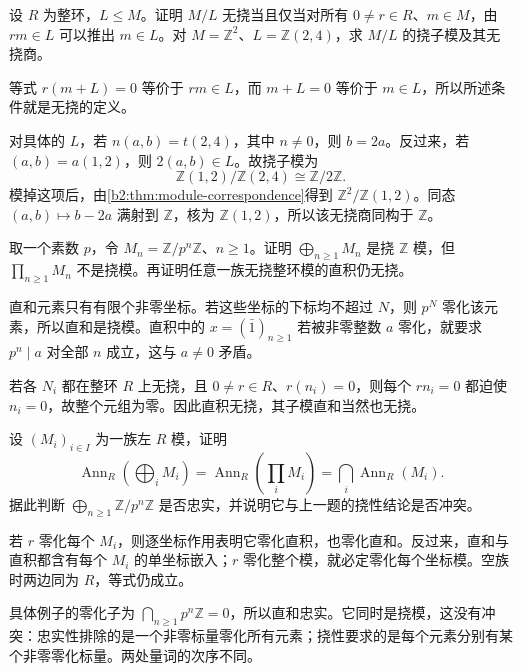 \begin{exercise}\label{b2:ex:02-torsion-quotient-lattice}
	设 \(R\) 为整环，\(L\le M\)。证明 \(M/L\) 无挠当且仅当对所有 \(0\ne r\in R\)、\(m\in M\)，由 \(rm\in L\) 可以推出 \(m\in L\)。对 \(M=\mathbb Z^2\)、\(L=\mathbb Z(2,4)\)，求 \(M/L\) 的挠子模及其无挠商。
\end{exercise}
\begin{solution}
	等式 \(r(m+L)=0\) 等价于 \(rm\in L\)，而 \(m+L=0\) 等价于 \(m\in L\)，所以所述条件就是无挠的定义。

	对具体的 \(L\)，若 \(n(a,b)=t(2,4)\)，其中 \(n\ne0\)，则 \(b=2a\)。反过来，若 \((a,b)=a(1,2)\)，则 \(2(a,b)\in L\)。故挠子模为
	\[
		\mathbb Z(1,2)/\mathbb Z(2,4)\cong\mathbb Z/2\mathbb Z.
	\]
	模掉这项后，由\cref{b2:thm:module-correspondence}得到 \(\mathbb Z^2/\mathbb Z(1,2)\)。同态 \((a,b)\mapsto b-2a\) 满射到 \(\mathbb Z\)，核为 \(\mathbb Z(1,2)\)，所以该无挠商同构于 \(\mathbb Z\)。
\end{solution}

\begin{exercise}\label{b2:ex:02-torsion-product}
	取一个素数 \(p\)，令 \(M_n=\mathbb Z/p^n\mathbb Z\)、\(n\ge1\)。证明 \(\bigoplus_{n\ge1}M_n\) 是挠 \(\mathbb Z\) 模，但 \(\prod_{n\ge1}M_n\) 不是挠模。再证明任意一族无挠整环模的直积仍无挠。
\end{exercise}
\begin{solution}
	直和元素只有有限个非零坐标。若这些坐标的下标均不超过 \(N\)，则 \(p^N\) 零化该元素，所以直和是挠模。直积中的 \(x=(\bar1)_{n\ge1}\) 若被非零整数 \(a\) 零化，就要求 \(p^n\mid a\) 对全部 \(n\) 成立，这与 \(a\ne0\) 矛盾。

	若各 \(N_i\) 都在整环 \(R\) 上无挠，且 \(0\ne r\in R\)、\(r(n_i)=0\)，则每个 \(rn_i=0\) 都迫使 \(n_i=0\)，故整个元组为零。因此直积无挠，其子模直和当然也无挠。
\end{solution}

\begin{exercise}\label{b2:ex:02-annihilator-sum-product}
	设 \((M_i)_{i\in I}\) 为一族左 \(R\) 模，证明
	\[
		\operatorname{Ann}_R\!\left(\bigoplus_iM_i\right) =\operatorname{Ann}_R\!\left(\prod_iM_i\right) =\bigcap_i\operatorname{Ann}_R(M_i).
	\]
	据此判断 \(\bigoplus_{n\ge1}\mathbb Z/p^n\mathbb Z\) 是否忠实，并说明它与上一题的挠性结论是否冲突。
\end{exercise}
\begin{solution}
	若 \(r\) 零化每个 \(M_i\)，则逐坐标作用表明它零化直积，也零化直和。反过来，直和与直积都含有每个 \(M_i\) 的单坐标嵌入；\(r\) 零化整个模，就必定零化每个坐标模。空族时两边同为 \(R\)，等式仍成立。

	具体例子的零化子为 \(\bigcap_{n\ge1}p^n\mathbb Z=0\)，所以直和忠实。它同时是挠模，这没有冲突：忠实性排除的是一个非零标量零化所有元素；挠性要求的是每个元素分别有某个非零零化标量。两处量词的次序不同。
\end{solution}

